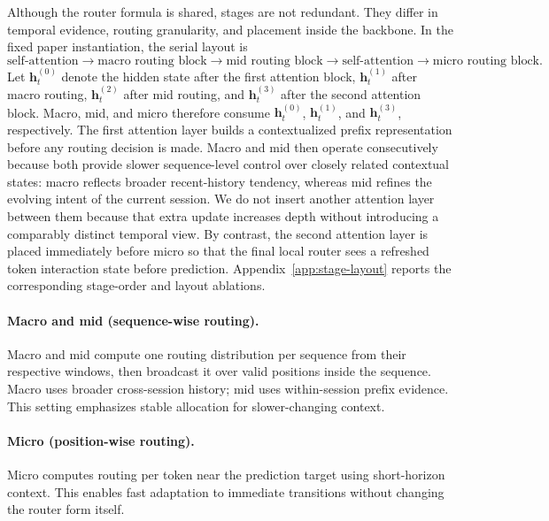 \documentclass[sigconf,review,anonymous]{acmart}
\begin{document}
Although the router formula is shared, stages are not redundant. They differ in temporal evidence, routing granularity, and placement inside the backbone. In the fixed paper instantiation, the serial layout is
\[
\text{self-attention} \rightarrow \text{macro routing block} \rightarrow \text{mid routing block} \rightarrow \text{self-attention} \rightarrow \text{micro routing block}.
\]
Let $\mathbf{h}^{(0)}_t$ denote the hidden state after the first attention block, $\mathbf{h}^{(1)}_t$ after macro routing, $\mathbf{h}^{(2)}_t$ after mid routing, and $\mathbf{h}^{(3)}_t$ after the second attention block. Macro, mid, and micro therefore consume $\mathbf{h}^{(0)}_t$, $\mathbf{h}^{(1)}_t$, and $\mathbf{h}^{(3)}_t$, respectively. The first attention layer builds a contextualized prefix representation before any routing decision is made. Macro and mid then operate consecutively because both provide slower sequence-level control over closely related contextual states: macro reflects broader recent-history tendency, whereas mid refines the evolving intent of the current session. We do not insert another attention layer between them because that extra update increases depth without introducing a comparably distinct temporal view. By contrast, the second attention layer is placed immediately before micro so that the final local router sees a refreshed token interaction state before prediction. Appendix~\ref{app:stage-layout} reports the corresponding stage-order and layout ablations.

\paragraph{Macro and mid (sequence-wise routing).}
Macro and mid compute one routing distribution per sequence from their respective windows, then broadcast it over valid positions inside the sequence. Macro uses broader cross-session history; mid uses within-session prefix evidence. This setting emphasizes stable allocation for slower-changing context.

\paragraph{Micro (position-wise routing).}
Micro computes routing per token near the prediction target using short-horizon context. This enables fast adaptation to immediate transitions without changing the router form itself.
\end{document}
